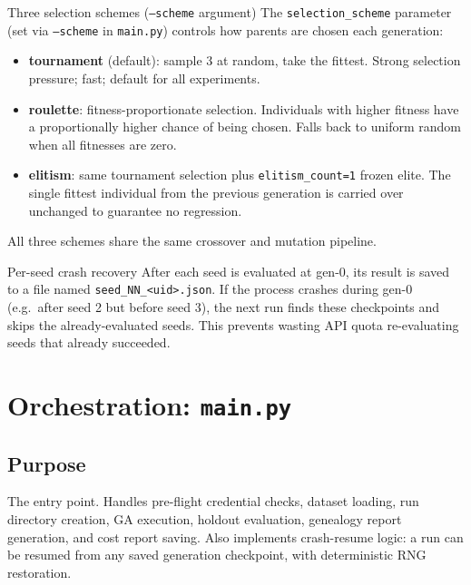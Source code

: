 \documentclass[11pt,a4paper]{report}
\newcommand{\pyfile}[1]{\texttt{#1}}
\newcommand{\fn}[1]{\texttt{#1}}
\begin{document}
\begin{conceptbox}{Three selection schemes (\fn{--scheme} argument)}
The \fn{selection\_scheme} parameter (set via \fn{--scheme} in \fn{main.py}) controls
how parents are chosen each generation:
\begin{itemize}[nosep]
  \item \textbf{tournament} (default): sample 3 at random, take the fittest.
    Strong selection pressure; fast; default for all experiments.
  \item \textbf{roulette}: fitness-proportionate selection.  Individuals with
    higher fitness have a proportionally higher chance of being chosen.
    Falls back to uniform random when all fitnesses are zero.
  \item \textbf{elitism}: same tournament selection plus \fn{elitism\_count=1}
    frozen elite.  The single fittest individual from the previous generation
    is carried over unchanged to guarantee no regression.
\end{itemize}
All three schemes share the same crossover and mutation pipeline.
\end{conceptbox}

\begin{conceptbox}{Per-seed crash recovery}
After each seed is evaluated at gen-0, its result is saved to a file named
\fn{seed\_NN\_<uid>.json}.  If the process crashes during gen-0 (e.g.\ after seed 2 but
before seed 3), the next run finds these checkpoints and skips the already-evaluated
seeds.  This prevents wasting API quota re-evaluating seeds that already succeeded.
\end{conceptbox}


\chapter{Orchestration: \pyfile{main.py}}

\section{Purpose}

The entry point.  Handles pre-flight credential checks, dataset loading, run directory
creation, GA execution, holdout evaluation, genealogy report generation, and cost report
saving.  Also implements crash-resume logic: a run can be resumed from any saved
generation checkpoint, with deterministic RNG restoration.
\end{document}
